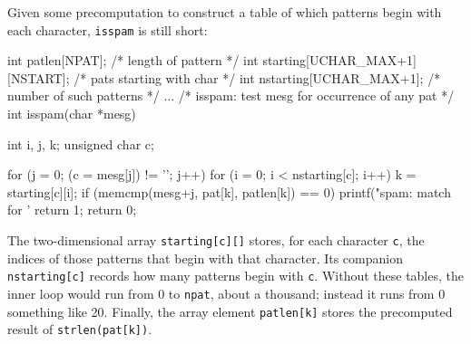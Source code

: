 Given some precomputation to construct a table of which patterns begin with
each character, \verb'isspam' is still short:
\begin{wellcode}
    int patlen[NPAT];                   /* length of pattern */
    int starting[UCHAR_MAX+1][NSTART];  /* pats starting with char */
    int nstarting[UCHAR_MAX+1];         /* number of such patterns */
    ...
    /* isspam: test mesg for occurrence of any pat */
    int isspam(char *mesg)
    {
        int i, j, k;
        unsigned char c;

        for (j = 0; (c = mesg[j]) != '\0'; j++) {
            for (i = 0; i < nstarting[c]; i++) {
                k = starting[c][i];
                if (memcmp(mesg+j, pat[k], patlen[k]) == 0) {
                    printf("spam: match for '%
                    return 1;
                }
            }
        }
        return 0;
    }
\end{wellcode}
The two-dimensional array \verb'starting[c][]' stores, for each character
\verb'c', the indices of those patterns that begin with that character. Its
companion \verb'nstarting[c]' records how many patterns begin with
\verb'c'. Without these tables, the inner loop would run from 0 to
\verb'npat', about a thousand; instead it runs from 0 something like 20.
Finally, the array element \verb'patlen[k]' stores the precomputed result
of \verb'strlen(pat[k])'.


